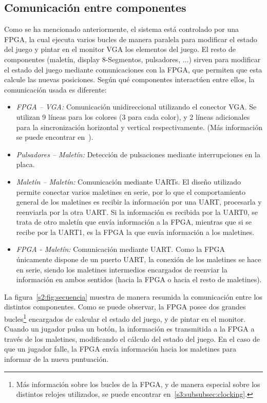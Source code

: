 \subsection{Comunicación entre componentes}
\label{s2:subsec:comunicacion}
Como se ha mencionado anteriormente, el sistema está controlado por una
FPGA, la cual ejecuta varios bucles de manera paralela para modificar el
estado del juego y pintar en el monitor VGA los elementos del juego. El
resto de componentes (maletín, display 8-Segmentos, pulsadores, $\ldots$)
sirven para modificar el estado del juego mediante comunicaciones con la
FPGA, que permiten que esta calcule las nuevas posiciones. Según qué
componentes interactúen entre ellos, la comunicación usada es diferente:
\begin{itemize}
\item \emph{FPGA -- VGA:} Comunicación unidireccional utilizando el
  conector VGA. Se utilizan 9 líneas para los colores (3 para cada color),
  y 2 líneas adicionales para la sincronización horizontal y vertical
  respectivamente. (Más información se puede encontrar
  en~\cite{Spartan3-StarterKit}).
\item \emph{Pulsadores -- Maletín:} Detección de pulsaciones mediante
  interrupciones en la placa.
\item \emph{Maletín -- Maletín:} Comunicación mediante UARTs. El diseño
  utilizado permite conectar varios maletines en serie, por lo que el
  comportamiento general de los maletines es recibir la información por una
  UART, procesarla y reenviarla por la otra UART. Si la información es
  recibida por la UART0, se trata de otro maletín que envía información a
  la FPGA, mientras que si se recibe por la UART1, es la FPGA la que envía
  información a los maletines.
\item \emph{FPGA - Maletín:} Comunicación mediante UART. Como la FPGA
  únicamente dispone de un puerto UART, la conexión de los maletines se
  hace en serie, siendo los maletines intermedios encargados de reenviar la
  información en ambos sentidos (hacia la FPGA o hacia el resto de
  maletines).
\end{itemize}

La figura~\ref{s2:fig:secuencia} muestra de manera resumida la comunicación
entre los distintos componentes. Como se puede observar, la FPGA posee dos
grandes bucles\footnote{Más información sobre los bucles de la FPGA, y de
  manera especial sobre los distintos relojes utilizados, se puede encontrar
en~\ref{s3:subsubsec:clocking}.} encargados de calcular el estado del juego, y de pintar en
el monitor. Cuando un jugador pulsa un botón, la información es transmitida
a la FPGA a través de los maletines, modificando el cálculo del estado del
juego. En el caso de que un jugador falle, la FPGA envía información hacia
los maletines para informar de la nueva puntuación.

